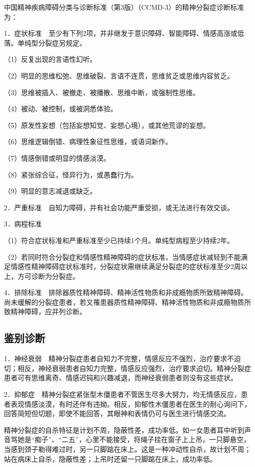中国精神疾病障碍分类与诊断标准（第3版）（CCMD-3）的精神分裂症诊断标准为：

1．症状标准　至少有下列2项，并非继发于意识障碍、智能障碍、情感高涨或低落。单纯型分裂症另规定。

（1）反复出现的言语性幻听。

（2）明显的思维松弛、思维破裂、言语不连贯，思维贫乏或思维内容贫乏。

（3）思维被插入、被撤走、被播散、思维中断，或强制性思维。

（4）被动、被控制，或被洞悉体验。

（5）原发性妄想（包括妄想知觉、妄想心境），或其他荒谬的妄想。

（6）思维逻辑倒错、病理性象征性思维，或语词新作。

（7）情感倒错或明显的情感淡漠。

（8）紧张综合征，怪异行为，或愚蠢行为。

（9）明显的意志减退或缺乏。

2．严重标准　自知力障碍，并有社会功能严重受损，或无法进行有效交谈。

3．病程标准

（1）符合症状标准和严重标准至少已持续1个月。单纯型病程至少持续2年。

（2）若同时符合分裂症和情感性精神障碍的症状标准，当情感症状减轻到不能满足情感性精神障碍症状标准时，分裂症状需继续满足分裂症的症状标准至少2周以上，方可诊断为分裂症。

4．排除标准　排除器质性精神障碍、精神活性物质和非成瘾物质所致精神障碍。尚未缓解的分裂症患者，若又罹患器质性精神障碍、精神活性物质和非成瘾物质所致精神障碍，应并列诊断。

\subsection{鉴别诊断}

1．神经衰弱　精神分裂症患者自知力不完整，情感反应不强烈，治疗要求不迫切；相反，神经衰弱患者自知力完整，情感反应强烈，治疗要求迫切。精神分裂症患者可有思维离奇、情感迟钝和兴趣减退，而神经衰弱患者则没有这些症状。

2．抑郁症　精神分裂症紧张型木僵患者不管医生尽多大努力，均无情感反应，患者表现情感淡漠，有时还伴有违拗。相反，抑郁性木僵患者在医生的耐心询问下，回答简短但切题，即使不能回答，其眼神和表情仍可与医生进行情感交流。

精神分裂症的自杀特征是计划不周，隐蔽性差，成功率低。如一女患者耳中听到声音骂她是“痴子”、“二五”，心里不能接受，将绳子挂在窗子上上吊，一只脚悬空，当感到颈子勒得难过时，另一只脚踮在床上。这是一种冲动性自杀，故计划不周；站在病床上自杀，隐蔽性差；上吊时还留一只脚踮在床上，成功率低。

